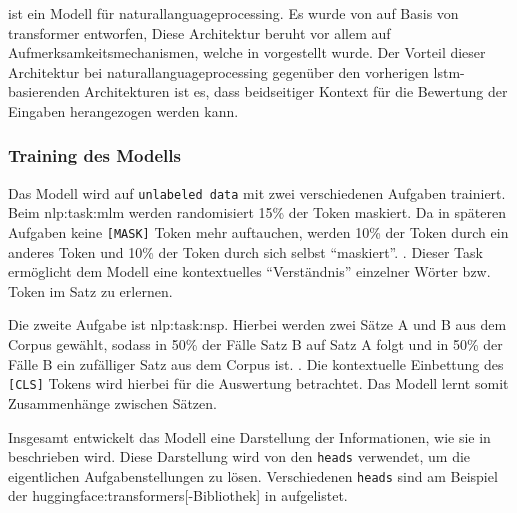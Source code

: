  ist ein Modell für \gls{naturallanguageprocessing}.
Es wurde von \citeauthor{1810.04805} auf Basis von \gls{transformer} entworfen,
Diese Architektur beruht vor allem auf Aufmerksamkeitsmechanismen,
welche in \autocite{1706.03762} vorgestellt wurde.
Der Vorteil dieser Architektur bei \gls{naturallanguageprocessing}
gegenüber den vorherigen \gls{lstm}-basierenden Architekturen ist es,
dass beidseitiger Kontext für die Bewertung der Eingaben herangezogen werden kann.

\subsubsection{Training des Modells}
Das Modell wird auf \texttt{unlabeled data}
mit zwei verschiedenen Aufgaben trainiert.
Beim \gls{nlp:task:mlm}
werden randomisiert 15\% der Token maskiert.
Da in späteren Aufgaben keine \texttt{[MASK]}
Token mehr auftauchen,
werden 10\% der Token durch ein anderes Token
und 10\% der Token durch sich selbst \enquote{maskiert}.
\autocite[3.1 Task \# 1]{1810.04805}.
Dieser Task ermöglicht dem Modell
eine kontextuelles \enquote{Verständnis}
einzelner Wörter bzw. Token im Satz zu erlernen.

Die zweite Aufgabe ist \gls{nlp:task:nsp}.
Hierbei werden zwei Sätze A und B aus dem Corpus gewählt,
sodass in 50\% der Fälle Satz B auf Satz A folgt
und in 50\% der Fälle B ein zufälliger Satz aus dem Corpus ist.
\autocite[3.1 Task \# 2]{1810.04805}.
Die kontextuelle Einbettung des  \texttt{[CLS]} Tokens
wird hierbei für die Auswertung betrachtet.
Das Modell lernt somit Zusammenhänge zwischen Sätzen.

Insgesamt entwickelt das Modell eine Darstellung der Informationen,
wie sie in~
beschrieben wird.
Diese Darstellung wird von den \texttt{heads} verwendet,
um die eigentlichen Aufgabenstellungen zu lösen.
Verschiedenen \texttt{heads} sind am Beispiel der \gls{huggingface:transformers}[-Bibliothek]
in  aufgelistet.

